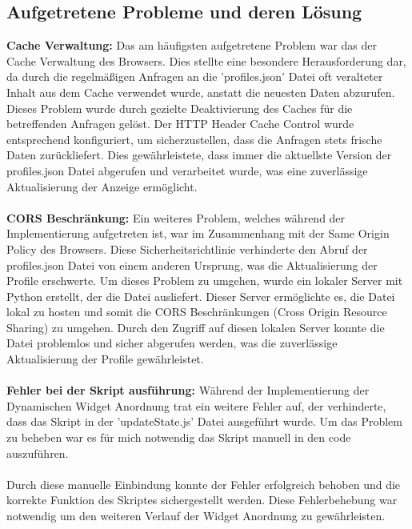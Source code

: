 \subsection*{Aufgetretene Probleme und deren Lösung}
\textbf{Cache Verwaltung:} Das am häufigsten aufgetretene Problem war das der Cache Verwaltung des Browsers. Dies stellte eine besondere Herausforderung dar, da durch die regelmäßigen Anfragen an die 'profiles.json' Datei oft veralteter Inhalt aus dem Cache verwendet wurde, anstatt die neuesten Daten abzurufen. Dieses Problem wurde durch gezielte Deaktivierung des Caches für die betreffenden Anfragen gelöst. Der HTTP Header Cache Control wurde entsprechend konfiguriert, um sicherzustellen, dass die Anfragen stets frische Daten zurückliefert. Dies gewährleistete, dass immer die aktuellste Version der profiles.json Datei abgerufen und verarbeitet wurde, was eine zuverlässige Aktualisierung der Anzeige ermöglicht. \\ \\
\noindent
\textbf{CORS Beschränkung:} Ein weiteres Problem, welches während der Implementierung aufgetreten ist, war im Zusammenhang mit der Same Origin Policy des Browsers. Diese Sicherheitsrichtlinie verhinderte den Abruf der profiles.json Datei von einem anderen Ursprung, was die Aktualisierung der Profile erschwerte. Um dieses Problem zu umgehen, wurde ein lokaler Server mit Python erstellt, der die Datei ausliefert. Dieser Server ermöglichte es, die Datei lokal zu hosten und somit die CORS Beschränkungen (Cross Origin Resource Sharing) zu umgehen. Durch den Zugriff auf diesen lokalen Server konnte die Datei problemlos und sicher abgerufen werden, was die zuverlässige Aktualisierung der Profile gewährleistet.
\\ \\
\noindent
\textbf{Fehler bei der Skript ausführung:} Während der Implementierung der Dynamischen Widget Anordnung trat ein weitere Fehler auf, der verhinderte, dass das Skript in der 'updateState.js' Datei ausgeführt wurde. Um das Problem zu beheben war es für mich notwendig das Skript manuell in den code auszuführen. \\ \\
Durch diese manuelle Einbindung konnte der Fehler erfolgreich behoben und die korrekte Funktion des Skriptes sichergestellt werden. Diese Fehlerbehebung war notwendig um den weiteren Verlauf der Widget Anordnung zu gewährleisten.

